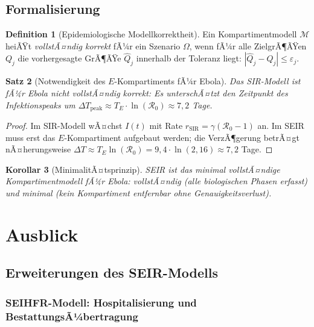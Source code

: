 ﻿\documentclass[12pt,a4paper]{article}
\theoremstyle{definition}
\newtheorem{definition}{Definition}[section]
\theoremstyle{plain}
\newtheorem{satz}[definition]{Satz}
\newtheorem{korollar}[definition]{Korollar}
\theoremstyle{remark}
\begin{document}
\subsection{Formalisierung}

\begin{definition}[Epidemiologische Modellkorrektheit]
Ein Kompartimentmodell $\mathcal{M}$ heiÃŸt \emph{vollstÃ¤ndig korrekt} fÃ¼r ein
Szenario $\Omega$, wenn fÃ¼r alle ZielgrÃ¶ÃŸen $Q_j$ die vorhergesagte GrÃ¶ÃŸe $\hat{Q}_j$
innerhalb der Toleranz liegt: $|\hat{Q}_j - Q_j| \leq \varepsilon_j$.
\end{definition}

\begin{satz}[Notwendigkeit des $E$-Kompartiments fÃ¼r Ebola]
\label{satz:e_notwendig}
Das SIR-Modell ist fÃ¼r Ebola nicht vollstÃ¤ndig korrekt: Es unterschÃ¤tzt den
Zeitpunkt des Infektionspeaks um
$\Delta T_{\text{peak}} \approx T_E \cdot \ln(\mathcal{R}_0) \approx 7{,}2$ Tage.
\end{satz}

\begin{proof}
Im SIR-Modell wÃ¤chst $I(t)$ mit Rate $r_{\text{SIR}} = \gamma(\mathcal{R}_0-1)$ an.
Im SEIR muss erst das $E$-Kompartiment aufgebaut werden; die VerzÃ¶gerung betrÃ¤gt
nÃ¤herungsweise $\Delta T \approx T_E \ln(\mathcal{R}_0) = 9{,}4 \cdot \ln(2{,}16) \approx 7{,}2$ Tage.
\end{proof}

\begin{korollar}[MinimalitÃ¤tsprinzip]
SEIR ist das minimal vollstÃ¤ndige Kompartimentmodell fÃ¼r Ebola: vollstÃ¤ndig
(alle biologischen Phasen erfasst) und minimal (kein Kompartiment entfernbar ohne Genauigkeitsverlust).
\end{korollar}

\section{Ausblick}
\label{sec:ausblick}

\subsection{Erweiterungen des SEIR-Modells}

\subsubsection{SEIHFR-Modell: Hospitalisierung und BestattungsÃ¼bertragung}
\end{document}
